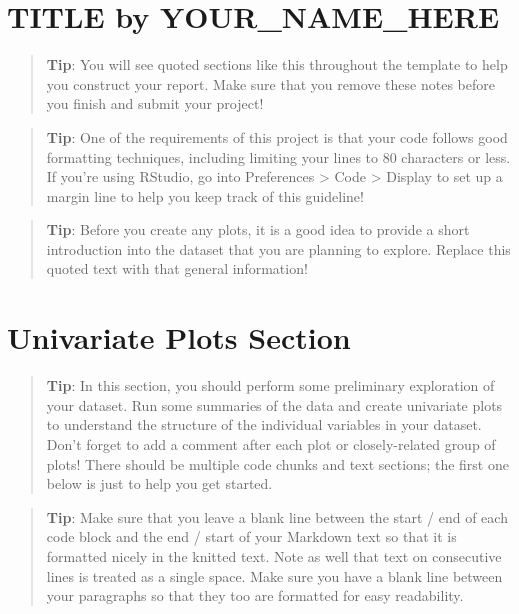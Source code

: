 \documentclass[]{article}
\begin{document}
\hypertarget{title-by-your_name_here}{%
\section{TITLE by YOUR\_NAME\_HERE}\label{title-by-your_name_here}}

\begin{quote}
\textbf{Tip}: You will see quoted sections like this throughout the
template to help you construct your report. Make sure that you remove
these notes before you finish and submit your project!
\end{quote}

\begin{quote}
\textbf{Tip}: One of the requirements of this project is that your code
follows good formatting techniques, including limiting your lines to 80
characters or less. If you're using RStudio, go into Preferences
\textgreater{} Code \textgreater{} Display to set up a margin line to
help you keep track of this guideline!
\end{quote}

\begin{quote}
\textbf{Tip}: Before you create any plots, it is a good idea to provide
a short introduction into the dataset that you are planning to explore.
Replace this quoted text with that general information!
\end{quote}

\hypertarget{univariate-plots-section-1}{%
\section{Univariate Plots Section}\label{univariate-plots-section-1}}

\begin{quote}
\textbf{Tip}: In this section, you should perform some preliminary
exploration of your dataset. Run some summaries of the data and create
univariate plots to understand the structure of the individual variables
in your dataset. Don't forget to add a comment after each plot or
closely-related group of plots! There should be multiple code chunks and
text sections; the first one below is just to help you get started.
\end{quote}

\begin{quote}
\textbf{Tip}: Make sure that you leave a blank line between the start /
end of each code block and the end / start of your Markdown text so that
it is formatted nicely in the knitted text. Note as well that text on
consecutive lines is treated as a single space. Make sure you have a
blank line between your paragraphs so that they too are formatted for
easy readability.
\end{quote}
\end{document}
